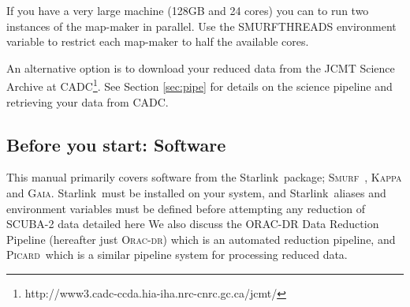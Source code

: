 \documentclass[twoside,11pt]{article}
\newcommand{\htmladdnormallink}[2]{#1}
\newcommand{\xref}[3]{#1}
\newcommand{\xlabel}[1]{}
\renewcommand{\_}{\texttt{\symbol{95}}}
\newcommand{\starlink}{\htmladdnormallink{Starlink}{http://starlink.jach.hawaii.edu}}
\newcommand{\Kappa}{\xref{\textsc{Kappa}}{sun95}{}}
\newcommand{\gaia}{\xref{\textsc{Gaia}}{sun214}{}}
\newcommand{\oracdr}{\xref{\textsc{Orac-dr}}{sun231}{}}
\newcommand{\picard}{\xref{\textsc{Picard}}{sun231}{}}
\newcommand{\smurf}{\xref{\textsc{Smurf}}{sun258}{}}
\newcommand{\smurfsun}{\xref{\textbf{SUN/258}}{sun258}{}}
\begin{document}
If you have a very large machine (128GB and 24 cores) you can to run two instances of the map-maker in parallel. Use the SMURF\_THREADS environment variable to restrict each map-maker to half the available cores.

An alternative option is to download your reduced data from the JCMT Science Archive at CADC\footnote{http://www3.cadc-ccda.hia-iha.nrc-cnrc.gc.ca/jcmt/}. See Section \ref{sec:pipe} for details on the science pipeline and retrieving your data from CADC.

\subsection{\xlabel{software}Before you start: Software}
This manual primarily covers software from the \starlink\ package;  \smurf\ \cite{smurf}, \Kappa \cite{kappa} and \gaia \cite{gaia}. \starlink\ must be installed on your system, and \starlink\ aliases and environment variables must be defined before attempting any reduction of SCUBA-2 data detailed here We also  discuss the ORAC-DR Data Reduction Pipeline (hereafter just \oracdr) which is an automated reduction pipeline, and \picard\ which is a similar pipeline system for processing reduced data.
\end{document}
